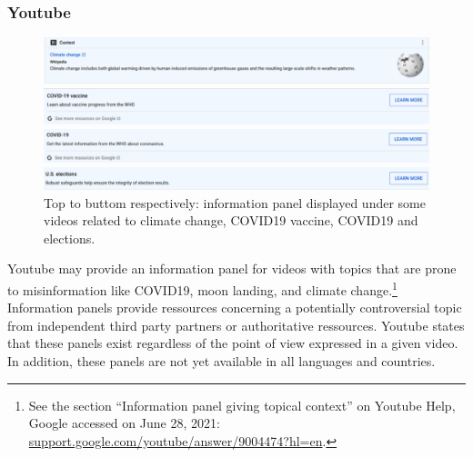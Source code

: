\documentclass{article}
\begin{document}
\subsubsection{Youtube}

\begin{figure}
	\centering
	\begin{multicols}{1}
		\includegraphics[scale=0.2]{./img/youtube_panels/yt_1.png} 
	\end{multicols}
	\begin{multicols}{1}
		\includegraphics[scale=0.2]{./img/youtube_panels/yt_2.png} 
	\end{multicols}
	\begin{multicols}{1}
		\includegraphics[scale=0.2]{./img/youtube_panels/yt_3.png}
	\end{multicols}
	\begin{multicols}{1}
		\includegraphics[scale=0.2]{./img/youtube_panels/yt_4.png} 
	\end{multicols}
	\caption{Top to buttom respectively: information panel displayed under some videos related to climate change, COVID19 vaccine, COVID19 and elections.}
	\label{fig9}
\end{figure}

Youtube may provide an information panel for videos with topics that are prone to misinformation like COVID19, moon landing, and climate change.\footnote{See the section ``Information panel giving topical context'' on Youtube Help, Google accessed on June 28, 2021: \href{https://support.google.com/youtube/answer/9004474?hl=en}{support.google.com/youtube/answer/9004474?hl=en}.} Information panels provide ressources concerning a potentially controversial topic from independent third party partners or authoritative ressources. Youtube states that these panels exist regardless of the point of view expressed in a given video. In addition, these panels are not yet available in all languages and countries. %
\end{document}
